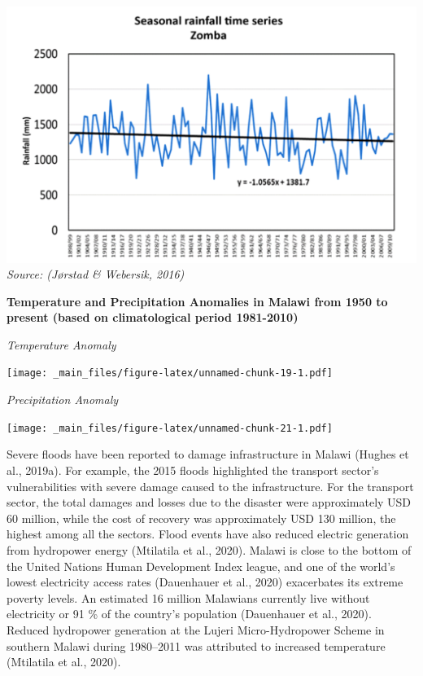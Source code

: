 \documentclass[
]{book}
\begin{document}
\includegraphics{images/pr_ts.png}
\emph{Source: (Jørstad \& Webersik, 2016)}

\textbf{Temperature and Precipitation Anomalies in Malawi from 1950 to present (based on climatological period 1981-2010)}

\emph{Temperature Anomaly}

\texttt{[image: \_main\_files/figure-latex/unnamed-chunk-19-1.pdf]}

\emph{Precipitation Anomaly}

\texttt{[image: \_main\_files/figure-latex/unnamed-chunk-21-1.pdf]}

Severe floods have been reported to damage infrastructure in Malawi (Hughes et al., 2019a). For example, the 2015 floods highlighted the transport sector's vulnerabilities with severe damage caused to the infrastructure. For the transport sector, the total damages and losses due to the disaster were approximately USD 60 million, while the cost of recovery was approximately USD 130 million, the highest among all the sectors. Flood events have also reduced electric generation from hydropower energy (Mtilatila et al., 2020). Malawi is close to the bottom of the United Nations Human Development Index league, and one of the world's lowest electricity access rates (Dauenhauer et al., 2020) exacerbates its extreme poverty levels. An estimated 16 million Malawians currently live without electricity or 91 \% of the country's population (Dauenhauer et al., 2020). Reduced hydropower generation at the Lujeri Micro-Hydropower Scheme in southern Malawi during 1980--2011 was attributed to increased temperature (Mtilatila et al., 2020).
\end{document}
